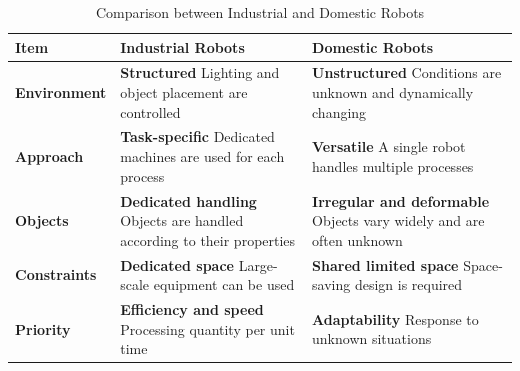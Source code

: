 \begin{table}[ht]
  \centering
  \caption{Comparison between Industrial and Domestic Robots}
  \label{tab:robot_comparison}
  \begingroup
  \footnotesize
  \setlength{\tabcolsep}{4pt}
  \renewcommand{\arraystretch}{0.95}
  \begin{tabularx}{.95\textwidth}{@{}lXX@{}}
    \toprule
    Item & Industrial Robots & Domestic Robots \\
    \midrule
    \textbf{Environment}
    & \textbf{Structured} \newline Lighting and object placement are controlled
    & \textbf{Unstructured} \newline Conditions are unknown and dynamically changing \\
    \midrule
    \textbf{Approach}
    & \textbf{Task-specific} \newline Dedicated machines are used for each process
    & \textbf{Versatile} \newline A single robot handles multiple processes \\
    \midrule
    \textbf{Objects}
    & \textbf{Dedicated handling} \newline Objects are handled according to their properties
    & \textbf{Irregular and deformable} \newline Objects vary widely and are often unknown \\
    \midrule
    \textbf{Constraints}
    & \textbf{Dedicated space} \newline Large-scale equipment can be used
    & \textbf{Shared limited space} \newline Space-saving design is required \\
    \midrule
    \textbf{Priority}
    & \textbf{Efficiency and speed} \newline Processing quantity per unit time
    & \textbf{Adaptability} \newline Response to unknown situations \\
    \bottomrule
  \end{tabularx}
  \endgroup
\end{table}

